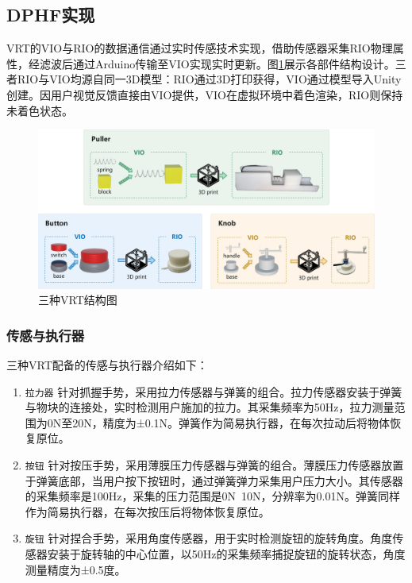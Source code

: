 \documentclass[runningheads]{llncs}
\begin{document}
\subsection{DPHF实现}
VRT的VIO与RIO的数据通信通过实时传感技术实现，借助传感器采集RIO物理属性，经滤波后通过Arduino传输至VIO实现实时更新。图\ref{fig:structural-diagram}展示各部件结构设计。三者RIO与VIO均源自同一3D模型：RIO通过3D打印获得，VIO通过模型导入Unity创建。因用户视觉反馈直接由VIO提供，VIO在虚拟环境中着色渲染，RIO则保持未着色状态。

\begin{figure}[t]
  \centering
  \includegraphics[width=1\textwidth]{image/Structural-Diagram.pdf}
  \caption{三种VRT结构图}
  \label{fig:structural-diagram}
\end{figure}

\subsubsection{传感与执行器}
三种VRT配备的传感与执行器介绍如下：
\begin{enumerate}[label={\arabic*)}]
  \item \texttt{拉力器} 针对抓握手势，采用拉力传感器与弹簧的组合。拉力传感器安装于弹簧与物块的连接处，实时检测用户施加的拉力。其采集频率为50Hz，拉力测量范围为0N至20N，精度为±0.1N。弹簧作为简易执行器，在每次拉动后将物体恢复原位。
  \item \texttt{按钮} 针对按压手势，采用薄膜压力传感器与弹簧的组合。薄膜压力传感器放置于弹簧底部，当用户按下按钮时，通过弹簧弹力采集用户压力大小。其传感器的采集频率是100Hz，采集的压力范围是0N~10N，分辨率为0.01N。弹簧同样作为简易执行器，在每次按压后将物体恢复原位。
  \item \texttt{旋钮} 针对捏合手势，采用角度传感器，用于实时检测旋钮的旋转角度。角度传感器安装于旋转轴的中心位置，以50Hz的采集频率捕捉旋钮的旋转状态，角度测量精度为±0.5度。
\end{enumerate}
\end{document}
